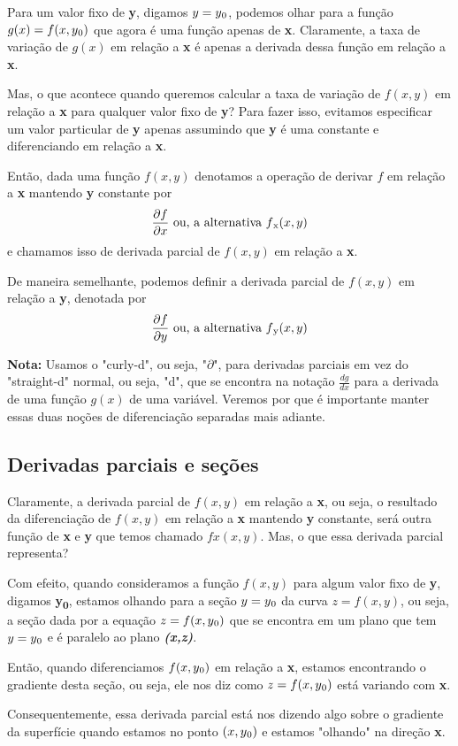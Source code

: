 \documentclass[a4paper]{article}
\begin{document}
Para um valor fixo de \textbf{y}, digamos $y = y\textsubscript{0}$, podemos olhar para a função $g(x) = f(x,y\textsubscript{0})$ que agora é uma função apenas de \textbf{x}. Claramente, a taxa de variação de $g(x)$ em relação a \textbf{x} é apenas a derivada dessa função em relação a \textbf{x}.
\par Mas, o que acontece quando queremos calcular a taxa de variação de $f(x,y)$ em relação a \textbf{x} para qualquer valor fixo de \textbf{y}? Para fazer isso, evitamos especificar um valor particular de \textbf{y} apenas assumindo que \textbf{y} é uma constante e diferenciando em relação a \textbf{x}.
\par Então, dada uma função $f(x,y)$ denotamos a operação de derivar $f$ em relação a \textbf{x} mantendo \textbf{y} constante por
\begin{equation}
    \frac{\partial f}{\partial x} \textrm{ ou, a alternativa }   f\textsubscript{x}(x,y)
\end{equation}
e chamamos isso de derivada parcial de $f(x,y)$ em relação a \textbf{x}.

\par De maneira semelhante, podemos definir a derivada parcial de $f(x,y)$ em relação a \textbf{y}, denotada por
\begin{equation}
    \frac{\partial f}{\partial y} \textrm{ ou, a alternativa }   f\textsubscript{y}(x,y)
\end{equation}
\par \textbf{Nota:} Usamos o "curly-d", ou seja, "$\partial$", para derivadas parciais em vez do "straight-d" normal, ou seja, "d", que se encontra na notação $\frac{dg}{dx}$ para a derivada de uma função $g(x)$ de uma variável. Veremos por que é importante manter essas duas noções de diferenciação separadas mais adiante.
\subsection*{Derivadas parciais e seções}
Claramente, a derivada parcial de $f(x,y)$ em relação a \textbf{x}, ou seja, o resultado da diferenciação de $f(x,y)$ em relação a \textbf{x} mantendo \textbf{y} constante, será outra função de \textbf{x} e \textbf{y} que temos chamado $fx(x,y)$. Mas, o que essa derivada parcial representa?
\par Com efeito, quando consideramos a função $f(x,y)$ para algum valor fixo de \textbf{y}, digamos \textbf{y\textsubscript{0}}, estamos olhando para a seção $y = y\textsubscript{0}$ da curva $z = f(x,y)$, ou seja, a seção dada por a equação $z = f(x,y\textsubscript{0})$ que se encontra em um plano que tem $y = y\textsubscript{0}$ e é paralelo ao plano \textit{\textbf{(x,z)}}.
\par Então, quando diferenciamos $f(x,y\textsubscript{0})$ em relação a \textbf{x}, estamos encontrando o gradiente desta seção, ou seja, ele nos diz como $z = f(x,y\textsubscript{0})$ está variando com \textbf{x}.
\par Consequentemente, essa derivada parcial está nos dizendo algo sobre o gradiente da superfície quando estamos no ponto $(x,y\textsubscript{0})$ e estamos "olhando" na direção \textbf{x}.
\end{document}
